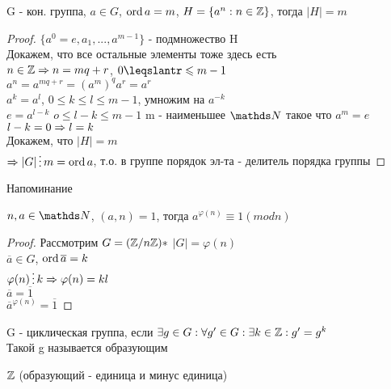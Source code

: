 \documentclass[12pt, fleqn]{article}
\begin{document}
\begin{consequence}
    G - кон. группа, $a \in G$, $\mathop{\rm ord}\nolimits a = m$, $H=\{a^n:n \in \mathbb{Z}\}$, тогда $|H|=m$\\
\end{consequence}

\begin{proof}
    $\{a^0=e,a_1,...,a^{m-1}\}$ - подмножество H\\
    Докажем, что все остальные элементы тоже здесь есть\\
    $n \in \mathbb{Z} \Rightarrow n=m q+r$, $0 \leqslantr \leqslant m-1$\\
    $a^n=a^{m q+r}=(a^m)^q a^r=a^r$\\
    $a^k=a^l$, $0 \leqslant k \leqslant l \leqslant m-1$, умножим на $a^{-k}$\\
    $e=a^{l-k}$ $o \leqslant l-k \leqslant m-1$ m - наименьшее $\N$ такое что $a^m=e$\\
    $l-k=0 \Rightarrow l=k$\\
    Докажем, что $|H|=m$\\
    $\Ra |G| \devides m=\ord a$, т.о. в группе порядок эл-та - делитель порядка группы
\end{proof}

Напоминание 

\begin{consequence}
    $n,a \in \N$, $(a,n)=1$, тогда $a^{\varphi(n)} \equiv 1 (mod n)$
\end{consequence}

\begin{proof}
    Рассмотрим $G=(\mathbb{Z} / n \mathbb{Z})*$ $|G|=\varphi(n)$\\
    $\overline{a} \in G$, $\mathop{\rm ord}\nolimits \overline{a}=k$\\
    $\varphi(n) \devides k \Ra \varphi(n) = kl$\\
    $\overline{a}=\overline{1}$\\
    $\overline{a}^{\varphi(n)}=\overline{1}$
\end{proof}

\begin{definition}
    G - циклическая группа, если $\exists g \in G: \forall g' \in G: \exists k \in \mathbb{Z}: g'=g^k$\\
    Такой g называется образующим
\end{definition}

\begin{example}
    $\mathbb{Z}$ (образующий - единица и минус единица)
\end{example}
\end{document}

